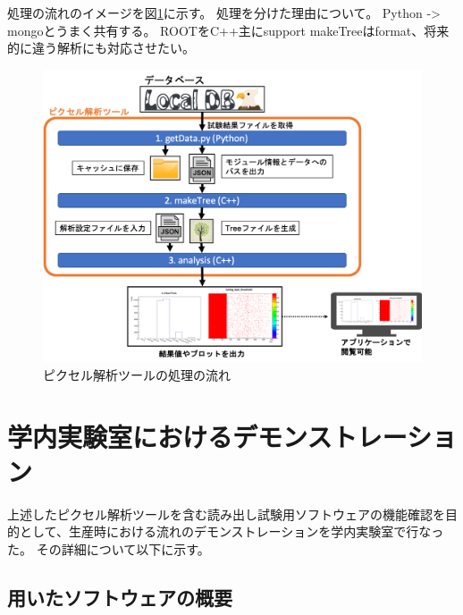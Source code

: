 処理の流れのイメージを図\ref{analysis_tool_flow}に示す。
処理を分けた理由について。
Python -> mongoとうまく共有する。
ROOTをC++主にsupport
makeTreeはformat、将来的に違う解析にも対応させたい。

\begin{figure}[bpt]\centering
\includegraphics[width=12cm]{analysis_tool_flow}
\caption[ピクセル解析ツールの処理の流れ]{ピクセル解析ツールの処理の流れ}
\label{analysis_tool_flow}
\end{figure}

\newpage
\section{学内実験室におけるデモンストレーション}

上述したピクセル解析ツールを含む読み出し試験用ソフトウェアの機能確認を目的として、生産時における流れのデモンストレーションを学内実験室で行なった。
その詳細について以下に示す。

\subsection{用いたソフトウェアの概要}

